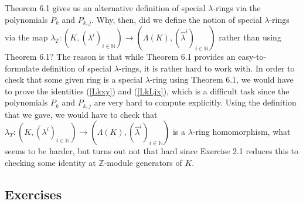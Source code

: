 \documentclass[numbers=enddot,12pt,final,onecolumn,notitlepage]{scrartcl}%
\begin{document}
Theorem 6.1 gives us an alternative definition of special $\lambda$-rings via
the polynomials $P_{k}$ and $P_{k,j}$. Why, then, did we define the notion of
special $\lambda$-rings via the map $\lambda_{T}:\left(  K,\left(  \lambda
^{i}\right)  _{i\in\mathbb{N}}\right)  \rightarrow\left(  \Lambda\left(
K\right)  ,\left(  \widehat{\lambda}^{i}\right)  _{i\in\mathbb{N}}\right)  $
rather than using Theorem 6.1? The reason is that while Theorem 6.1 provides
an easy-to-formulate definition of special $\lambda$-rings, it is rather hard
to work with. In order to check that some given ring is a special $\lambda
$-ring using Theorem 6.1, we would have to prove the identities (\ref{Lkxy})
and (\ref{LkLjx}), which is a difficult task since the polynomials $P_{k}$ and
$P_{k,j}$ are very hard to compute explicitly. Using the definition that we
gave, we would have to check that $\lambda_{T}:\left(  K,\left(  \lambda
^{i}\right)  _{i\in\mathbb{N}}\right)  \rightarrow\left(  \Lambda\left(
K\right)  ,\left(  \widehat{\lambda}^{i}\right)  _{i\in\mathbb{N}}\right)  $
is a $\lambda$-ring homomorphism, what seems to be harder, but turns out not
that hard since Exercise 2.1 reduces this to checking some identity at
$\mathbb{Z}$-module generators of $K$.

\subsection{Exercises}
\end{document}
